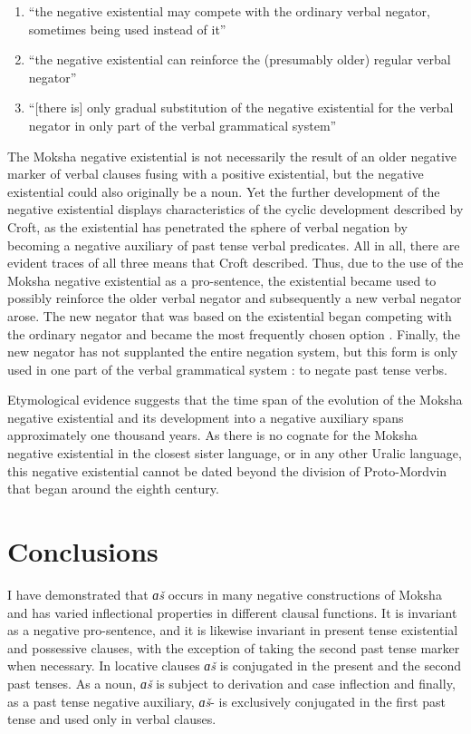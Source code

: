 \documentclass[output=paper,colorlinks,citecolor=brown,draft,draftmode]{langscibook}
\begin{document}
\begin{enumerate}
\item ``the negative existential may compete with the ordinary verbal negator, sometimes being used instead of it''
\item ``the negative existential can reinforce the (presumably older) regular verbal negator''
\item ``[there is] only gradual substitution of the negative existential for the verbal negator in only part of the verbal grammatical system''
\end{enumerate}

 The Moksha negative existential is not necessarily the result of an older negative marker of verbal clauses fusing with a positive existential, but the negative existential could also originally be a noun. Yet the further development of the negative existential displays characteristics of the cyclic development described by Croft, as the existential has penetrated the sphere of verbal negation by becoming a negative auxiliary of past tense verbal predicates. All in all, there are evident traces of all three means that Croft described. Thus, due to the use of the Moksha negative existential as a pro-sentence, the existential became used to possibly reinforce the older verbal negator  and subsequently a new verbal negator arose. The new negator that was based on the existential began competing with the ordinary negator and became the most frequently chosen option . Finally, the new negator has not supplanted the entire negation system, but this form is only used in one part of the verbal grammatical system : to negate past tense verbs. 

  Etymological evidence suggests that the time span of the evolution of the Moksha negative existential and its development into a negative auxiliary spans approximately one thousand years. As there is no cognate for the Moksha negative existential in the closest sister language,  or in any other Uralic language, this negative existential cannot be dated beyond the division of Proto-Mordvin that began around the eighth century.

\section{Conclusions}\label{sec:2:8}

I have demonstrated that \textit{ɑš} occurs in many negative constructions of Moksha and has varied inflectional properties in different clausal functions. It is invariant as a negative pro-sentence, and it is likewise invariant in present tense existential and possessive clauses, with the exception of taking the second past tense marker when necessary. In locative clauses \textit{ɑš} is conjugated in the present and the second past tenses. As a noun, \textit{ɑš} is subject to derivation and case inflection and finally, as a past tense negative auxiliary, \textit{ɑš}- is exclusively conjugated in the first past tense and used only in verbal clauses. 
\end{document}
